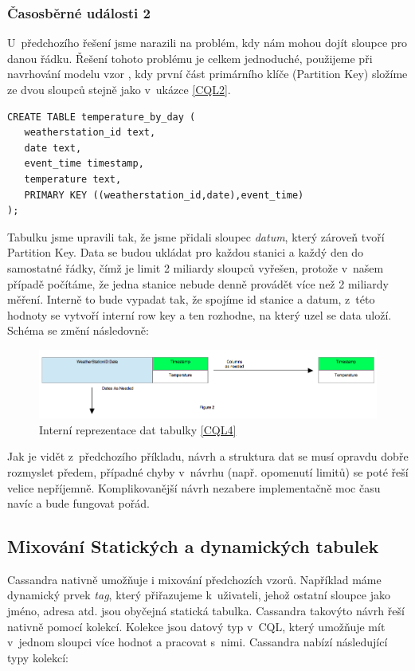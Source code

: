 \subsubsection*{Časosběrné události 2}
U~předchozího řešení jsme narazili na problém, kdy nám mohou dojít sloupce pro danou řádku. Řešení tohoto problému je celkem jednoduché, použijeme při navrhování modelu vzor , kdy první část primárního klíče (Partition Key) složíme ze dvou sloupců stejně jako v~ukázce \ref{CQL2}.


\begin{lstlisting}[caption={Dynamická tabulka 2},label=CQL4]
CREATE TABLE temperature_by_day (
   weatherstation_id text,
   date text,
   event_time timestamp,
   temperature text,
   PRIMARY KEY ((weatherstation_id,date),event_time)
);
\end{lstlisting}

Tabulku jsme upravili tak, že jsme přidali sloupec \emph{datum}, který zároveň tvoří Partition Key. Data se budou ukládat pro každou stanici a každý den do samostatné řádky, čímž je limit 2 miliardy sloupců vyřešen, protože v~našem případě počítáme, že jedna stanice nebude denně provádět více než 2 miliardy měření. Interně to bude vypadat tak, že spojíme id stanice a datum, z~této hodnoty se vytvoří interní row key a ten rozhodne, na který uzel se data uloží. Schéma se změní následovně: 

\begin{figure}[h]
\centering
\includegraphics[scale=0.4]{images/timeseries2}
\caption{Interní reprezentace dat tabulky \ref{CQL4}}
\label{fig:timeseries1}
\end{figure}

Jak je vidět z~předchozího příkladu, návrh a struktura dat se musí opravdu dobře rozmyslet předem, případné chyby v~návrhu (např. opomenutí limitů) se poté řeší velice nepříjemně. Komplikovanější návrh nezabere implementačně moc času navíc a bude fungovat pořád.


\subsection{Mixování Statických a dynamických tabulek}
Cassandra nativně umožňuje i mixování předchozích vzorů. Například máme dynamický prvek \emph{tag}, který přiřazujeme k~uživateli, jehož ostatní sloupce jako jméno, adresa atd. jsou obyčejná statická tabulka. Cassandra takovýto návrh řeší nativně pomocí kolekcí. Kolekce jsou datový typ v~CQL, který umožňuje mít v~jednom sloupci více hodnot a pracovat s~nimi. Cassandra nabízí následující typy kolekcí:

